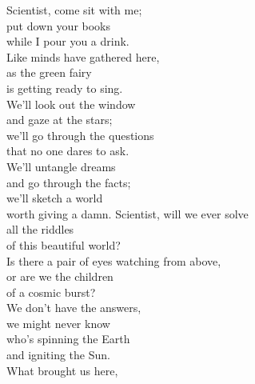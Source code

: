 \begin{flushleft}
Scientist, come sit with me; \tab{}\\
put down your books \tab{}\\
while I pour you a drink. \tab{}\\
Like minds have gathered here,\tab{}\\
as the green fairy \tab{}\\
is getting ready to sing. \tab{}\\
\hop
\hspace{0.9cm}We'll look out the window \\
\hspace{0.9cm}and gaze at the stars;\\
\hspace{0.9cm}we'll go through the questions\\
\hspace{0.9cm}that no one dares to ask.\\
\hspace{0.9cm}We'll untangle dreams\tab{}\\
\hspace{0.9cm}and go through the facts;\\
\hspace{0.9cm}we'll sketch a world\tab{}\\
\hspace{0.9cm}worth giving a damn.
\hops
Scientist, will we ever solve\\
all the riddles\\
of this beautiful world?\\
Is there a pair of eyes watching from above,\\
or are we the children\\
of a cosmic burst?\\
\hop
\hspace{0.9cm}We don't have the answers,\\
\hspace{0.9cm}we might never know\\
\hspace{0.9cm}who's spinning the Earth\\
\hspace{0.9cm}and igniting the Sun.\\
\hspace{0.9cm}What brought us here,\\

\end{flushleft}

